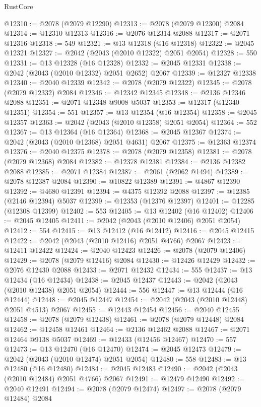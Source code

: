 \begin{lexlean}{RustCore}
\begin{coremodule}
@12310 := @2078 (@2079 @12290)
@12313 := @2078 (@2079 @12300) @2084
@12314 := @12310 @12313
@12316 := @2076 @12314 @2088
@12317 := @2071 @12316
@12318 := 549
@12321 := @13 @12318 (@16 @12318)
@12322 := @2045 @12321
@12327 := @2042 (@2043 (@2010 @12322) @2051 @2054)
@12328 := 550
@12331 := @13 @12328 (@16 @12328)
@12332 := @2045 @12331
@12338 := @2042 (@2043 (@2010 @12332) @2051 @2652) @2067
@12339 := @12327 @12338
@12340 := @2040 @12339
@12342 := @2078 (@2079 @12322)
@12345 := @2078 (@2079 @12332) @2084
@12346 := @12342 @12345
@12348 := @2136 @12346 @2088
@12351 := @2071 @12348 @9008 @5037
@12353 := @12317 (@12340 @12351)
@12354 := 551
@12357 := @13 @12354 (@16 @12354)
@12358 := @2045 @12357
@12363 := @2042 (@2043 (@2010 @12358) @2051 @2054)
@12364 := 552
@12367 := @13 @12364 (@16 @12364)
@12368 := @2045 @12367
@12374 := @2042 (@2043 (@2010 @12368) @2051 @4631) @2067
@12375 := @12363 @12374
@12376 := @2040 @12375
@12378 := @2078 (@2079 @12358)
@12381 := @2078 (@2079 @12368) @2084
@12382 := @12378 @12381
@12384 := @2136 @12382 @2088
@12385 := @2071 @12384
@12387 := @2061 (@2062 @1494)
@12389 := @2078 @12387 @2084
@12390 := @10822 @12389
@12391 := @4867 @12390
@12392 := @4680 @12391
@12394 := @4375 @12392 @2088
@12397 := @12385 (@2146 @12394) @5037
@12399 := @12353 (@12376 @12397)
@12401 := @12285 (@12308 @12399)
@12402 := 553
@12405 := @13 @12402 (@16 @12402)
@12406 := @2045 @12405
@12411 := @2042 (@2043 (@2010 @12406) @2051 @2054)
@12412 := 554
@12415 := @13 @12412 (@16 @12412)
@12416 := @2045 @12415
@12422 := @2042 (@2043 (@2010 @12416) @2051 @4766) @2067
@12423 := @12411 @12422
@12424 := @2040 @12423
@12426 := @2078 (@2079 @12406)
@12429 := @2078 (@2079 @12416) @2084
@12430 := @12426 @12429
@12432 := @2076 @12430 @2088
@12433 := @2071 @12432
@12434 := 555
@12437 := @13 @12434 (@16 @12434)
@12438 := @2045 @12437
@12443 := @2042 (@2043 (@2010 @12438) @2051 @2054)
@12444 := 556
@12447 := @13 @12444 (@16 @12444)
@12448 := @2045 @12447
@12454 := @2042 (@2043 (@2010 @12448) @2051 @4513) @2067
@12455 := @12443 @12454
@12456 := @2040 @12455
@12458 := @2078 (@2079 @12438)
@12461 := @2078 (@2079 @12448) @2084
@12462 := @12458 @12461
@12464 := @2136 @12462 @2088
@12467 := @2071 @12464 @9138 @5037
@12469 := @12433 (@12456 @12467)
@12470 := 557
@12473 := @13 @12470 (@16 @12470)
@12474 := @2045 @12473
@12479 := @2042 (@2043 (@2010 @12474) @2051 @2054)
@12480 := 558
@12483 := @13 @12480 (@16 @12480)
@12484 := @2045 @12483
@12490 := @2042 (@2043 (@2010 @12484) @2051 @4766) @2067
@12491 := @12479 @12490
@12492 := @2040 @12491
@12494 := @2078 (@2079 @12474)
@12497 := @2078 (@2079 @12484) @2084

\end{coremodule}
\end{lexlean}
